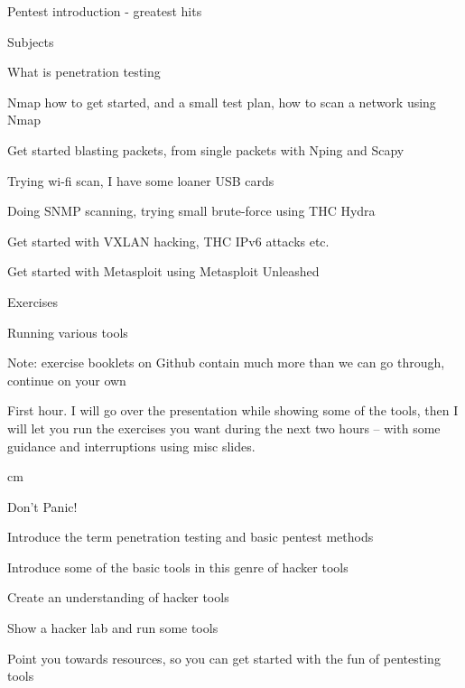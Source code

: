 \documentclass[Screen16to9,17pt]{foils}
\begin{document}
{}

\mytitlepage
{Pentest introduction - greatest hits}

\LogoOn



\begin{list1}
\item Subjects
\begin{list2}
\item What is penetration testing
\item Nmap how to get started, and a small test plan, how to scan a network using Nmap
\item Get started blasting packets, from single packets with Nping and Scapy
\item Trying wi-fi scan, I have some loaner USB cards
\item Doing SNMP scanning, trying small brute-force using THC Hydra
\item Get started with VXLAN hacking, THC IPv6 attacks etc.
\item Get started with Metasploit using Metasploit Unleashed
\end{list2}
\item Exercises
\begin{list2}
\item Running various tools
\item Note: exercise booklets on Github contain much more than we can go through, continue on your own
\end{list2}
\end{list1}

First hour.  I will go over the presentation while showing some of the tools, then I will let you run the exercises you want during the next two hours -- with some guidance and interruptions using misc slides.



 cm

\centerline{\color{titlecolor}\LARGE Don't Panic!}


\begin{list1}
\item Introduce the term penetration testing and basic pentest methods
\item Introduce some of the basic tools in this genre of hacker tools
\item Create an understanding of hacker tools
\item Show a hacker lab and run some tools
\item Point you towards resources, so you can get started with the fun of pentesting tools
\end{list1}
\end{document}
